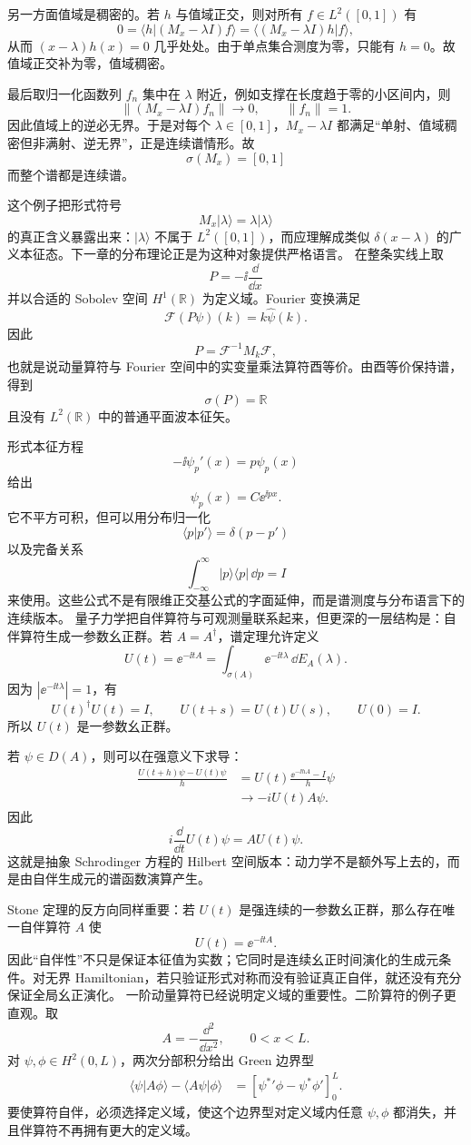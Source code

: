 另一方面值域是稠密的。若 $h$ 与值域正交，则对所有 $f\in L^2([0,1])$ 有
\[
0=\langle h|(M_x-\lambda I)f\rangle
=\langle (M_x-\lambda I)h|f\rangle,
\]
从而 $(x-\lambda)h(x)=0$ 几乎处处。由于单点集合测度为零，只能有 $h=0$。故值域正交补为零，值域稠密。

最后取归一化函数列 $f_n$ 集中在 $\lambda$ 附近，例如支撑在长度趋于零的小区间内，则
\[
\|(M_x-\lambda I)f_n\|\to0,
\qquad \|f_n\|=1.
\]
因此值域上的逆必无界。于是对每个 $\lambda\in[0,1]$，$M_x-\lambda I$ 都满足“单射、值域稠密但非满射、逆无界”，正是连续谱情形。故
\[
\boxed{\sigma(M_x)=[0,1]}
\]
而整个谱都是连续谱。

这个例子把形式符号
\[
M_x|\lambda\rangle=\lambda|\lambda\rangle
\]
的真正含义暴露出来：$|\lambda\rangle$ 不属于 $L^2([0,1])$，而应理解成类似 $\delta(x-\lambda)$ 的广义本征态。下一章的分布理论正是为这种对象提供严格语言。
在整条实线上取
\[
P=-\ii\frac{\dd}{\dd x}
\]
并以合适的 Sobolev 空间 $H^1(\mathbb R)$ 为定义域。Fourier 变换满足
\[
\mathcal F(P\psi)(k)=k\widehat\psi(k).
\]
因此
\[
P=\mathcal F^{-1}M_k\mathcal F,
\]
也就是说动量算符与 Fourier 空间中的实变量乘法算符酉等价。由酉等价保持谱，得到
\[
\boxed{\sigma(P)=\mathbb R}
\]
且没有 $L^2(\mathbb R)$ 中的普通平面波本征矢。

形式本征方程
\[
-\ii\psi_p'(x)=p\psi_p(x)
\]
给出
\[
\psi_p(x)=C \ee^{\ii px}.
\]
它不平方可积，但可以用分布归一化
\[
\langle p|p'\rangle=\delta(p-p')
\]
以及完备关系
\[
\int_{-\infty}^{\infty}|p\rangle\langle p|\,\dd p=I
\]
来使用。这些公式不是有限维正交基公式的字面延伸，而是谱测度与分布语言下的连续版本。
量子力学把自伴算符与可观测量联系起来，但更深的一层结构是：自伴算符生成一参数幺正群。若 $A=A^\dagger$，谱定理允许定义
\[
U(t)=\ee^{-\ii tA}
=\int_{\sigma(A)}\ee^{-\ii t\lambda}\,\dd E_A(\lambda).
\]
因为 $|\ee^{-\ii t\lambda}|=1$，有
\[
U(t)^\dagger U(t)=I,
\qquad
U(t+s)=U(t)U(s),
\qquad
U(0)=I.
\]
所以 $U(t)$ 是一参数幺正群。

若 $\psi\in D(A)$，则可以在强意义下求导：
\[
\begin{aligned}
\frac{U(t+h)\psi-U(t)\psi}{h}
&=U(t)\frac{\ee^{-\ii hA}-I}{h}\psi\\
&\longrightarrow -iU(t)A\psi.
\end{aligned}
\]
因此
\begin{equation*}\boxed{
i\frac{\dd}{\dd t}U(t)\psi=A U(t)\psi
}.\end{equation*}
这就是抽象 Schrodinger 方程的 Hilbert 空间版本：动力学不是额外写上去的，而是由自伴生成元的谱函数演算产生。

Stone 定理的反方向同样重要：若 $U(t)$ 是强连续的一参数幺正群，那么存在唯一自伴算符 $A$ 使
\[
U(t)=\ee^{-\ii tA}.
\]
因此“自伴性”不只是保证本征值为实数；它同时是连续幺正时间演化的生成元条件。对无界 Hamiltonian，若只验证形式对称而没有验证真正自伴，就还没有充分保证全局幺正演化。
一阶动量算符已经说明定义域的重要性。二阶算符的例子更直观。取
\[
A=-\frac{\dd^2}{\dd x^2},
\qquad 0<x<L.
\]
对 $\psi,\phi\in H^2(0,L)$，两次分部积分给出 Green 边界型
\[
\begin{aligned}
\langle\psi|A\phi\rangle-\langle A\psi|\phi\rangle
&=\left[\psi^*{}'\phi-\psi^*\phi'\right]_{0}^{L}.
\end{aligned}
\]
要使算符自伴，必须选择定义域，使这个边界型对定义域内任意 $\psi,\phi$ 都消失，并且伴算符不再拥有更大的定义域。


